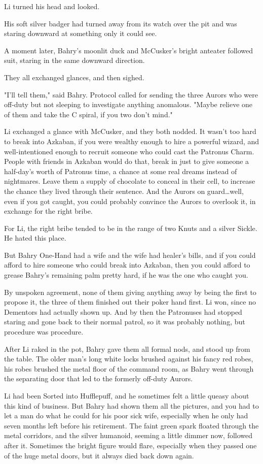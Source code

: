Li turned his head and looked.

His soft silver badger had turned away from its watch over the pit and was
staring downward at something only it could see.

A moment later, Bahry's moonlit duck and McCusker's bright anteater followed
suit, staring in the same downward direction.

They all exchanged glances, and then sighed.

"I'll tell them," said Bahry. Protocol called for sending the three Aurors who
were off-duty but not sleeping to investigate anything anomalous. "Maybe
relieve one of them and take the C spiral, if you two don't mind."

Li exchanged a glance with McCusker, and they both nodded. It wasn't too hard
to break into Azkaban, if you were wealthy enough to hire a powerful wizard,
and well-intentioned enough to recruit someone who could cast the Patronus
Charm. People with friends in Azkaban would do that, break in just to give
someone a half-day's worth of Patronus time, a chance at some real dreams
instead of nightmares. Leave them a supply of chocolate to conceal in their
cell, to increase the chance they lived through their sentence. And the Aurors
on guard…well, even if you got caught, you could probably convince the
Aurors to overlook it, in exchange for the right bribe.

For Li, the right bribe tended to be in the range of two Knuts and a silver
Sickle. He hated this place.

But Bahry One-Hand had a wife and the wife had healer's bills, and if you could
afford to hire someone who could break into Azkaban, then you could afford to
grease Bahry's remaining palm pretty hard, if he was the one who caught you.

By unspoken agreement, none of them giving anything away by being the first to
propose it, the three of them finished out their poker hand first. Li won,
since no Dementors had actually shown up. And by then the Patronuses had
stopped staring and gone back to their normal patrol, so it was probably
nothing, but procedure was procedure.

After Li raked in the pot, Bahry gave them all formal nods, and stood up from
the table. The older man's long white locks brushed against his fancy red
robes, his robes brushed the metal floor of the command room, as Bahry went
through the separating door that led to the formerly off-duty Aurors.

Li had been Sorted into Hufflepuff, and he sometimes felt a little queasy about
this kind of business. But Bahry had shown them all the pictures, and you had
to let a man do what he could for his poor sick wife, especially when he only
had seven months left before his retirement.
\later
The faint green spark floated through the metal corridors, and the silver
humanoid, seeming a little dimmer now, followed after it. Sometimes the bright
figure would flare, especially when they passed one of the huge metal doors,
but it always died back down again.

